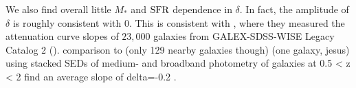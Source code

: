 We also find overall little $M_*$ and ${\rm SFR}$ dependence in $\delta$. In
fact, the amplitude of $\delta$ is roughly consistent with 0.  
This is consistent with \cite{salim2020}, where they measured the attenuation
curve slopes of $23,000$ galaxies from GALEX-SDSS-WISE Legacy Catalog 2
(). 
comparison to \cite{leja2017} (only 129 nearby galaxies though) 
\cite{viaene2017} (one galaxy, jesus)  
\cite{kriek2013}  using stacked SEDs of medium- and broadband photometry of
galaxies at 0.5 < z < 2 find an average slope of delta=-0.2 . %





